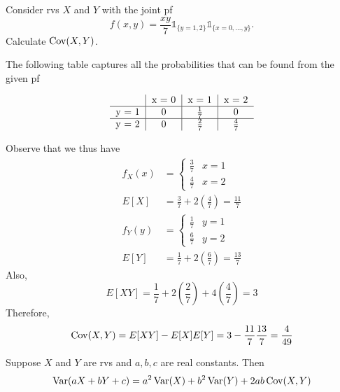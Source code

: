 \documentclass[notoc,notitlepage]{tufte-book}
\begin{document}
\begin{eg}[Example 3.18]
  Consider rvs $X$ and $Y$ with the joint pf
  \begin{equation*}
    f(x, y) = \frac{xy}{7} \mathbb{1}_{\{y = 1, 2\}} \mathbb{1}_{\{x = 0, ..., y\}}.
  \end{equation*}
  Calculate $\operatorname{Cov}(X, Y)$.

  \begin{solution}
    The following table captures all the probabilities that can be found from the given pf

    \[
    \begin{tabular}{c | c | c | c}
            & x = 0 & x = 1       & x = 2 \\
      \hline
      y = 1 & 0     & $\frac{1}{7}$ & 0 \\
      \hline
      y = 2 & 0     & $\frac{2}{7}$ & $\frac{4}{7}$
    \end{tabular}
    \]

    Observe that we thus have
    \begin{align*}
      f_X(x) &= \begin{cases}
        \frac{3}{7} & x = 1 \\
        \frac{4}{7} & x = 2
      \end{cases} \\
      E[X] &= \frac{3}{7} + 2 \left( \frac{4}{7} \right) = \frac{11}{7} \\
      f_Y(y) &= \begin{cases}
        \frac{1}{7} & y = 1 \\
        \frac{6}{7} & y = 2
      \end{cases} \\
      E[Y] &= \frac{1}{7} + 2 \left( \frac{6}{7} \right) = \frac{13}{7}
    \end{align*}
    Also,
    \begin{equation*}
      E[XY] = \frac{1}{7} + 2 \left( \frac{2}{7} \right) + 4 \left( \frac{4}{7} \right) = 3
    \end{equation*}
    Therefore,
    \begin{equation*}
      \operatorname{Cov}(X, Y) = E[XY] - E[X]E[Y] = 3 - \frac{11}{7} \frac{13}{7} = \frac{4}{49}
    \end{equation*}
  \end{solution}
\end{eg}

\begin{thm}
\label{thm:variance_of_linear_combinations}
  Suppose $X$ and $Y$ are rvs and $a, b, c$ are real constants. Then
  \begin{equation*}
    \operatorname{Var}(aX + bY + c) = a^2 \operatorname{Var}(X) + b^2 \operatorname{Var}(Y) + 2ab \operatorname{Cov} (X, Y)
  \end{equation*}
\end{thm}
\end{document}
